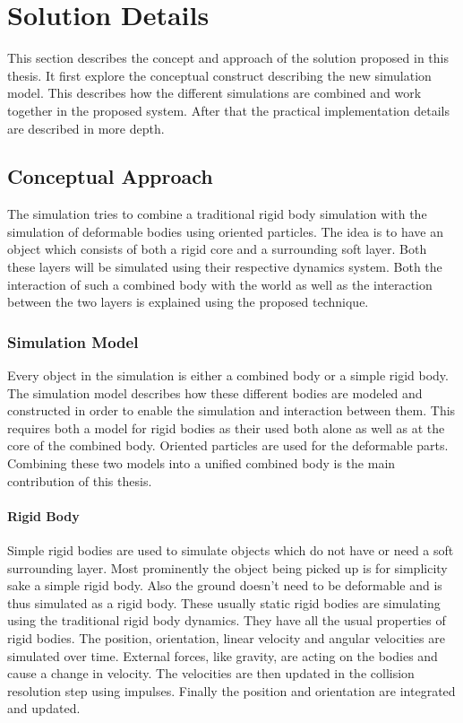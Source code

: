 \chapter{Solution Details}
\label{cha:solution_details}

This section describes the concept and approach of the solution proposed in this thesis. It first explore the conceptual construct describing the new simulation model. This describes how the different simulations are combined and work together in the proposed system. After that the practical implementation details are described in more depth.

\section{Conceptual Approach}
\label{sec:conceptual_approach}

The simulation tries to combine a traditional rigid body simulation with the simulation of deformable bodies using oriented particles. The idea is to have an object which consists of both a rigid core and a surrounding soft layer. Both these layers will be simulated using their respective dynamics system. Both the interaction of such a combined body with the world as well as the interaction between the two layers is explained using the proposed technique.

\subsection{Simulation Model}
\label{subsec:simulation_model}

Every object in the simulation is either a combined body or a simple rigid body. The simulation model describes how these different bodies are modeled and constructed in order to enable the simulation and interaction between them. This requires both a model for rigid bodies as their used both alone as well as at the core of the combined body. Oriented particles are used for the deformable parts. Combining these two models into a unified combined body is the main contribution of this thesis.
\subsubsection{Rigid Body}

Simple rigid bodies are used to simulate objects which do not have or need a soft surrounding layer. Most prominently the object being picked up is for simplicity sake a simple rigid body. Also the ground doesn't need to be deformable and is thus simulated as a rigid body. These usually static rigid bodies are simulating using the traditional rigid body dynamics. They have all the usual properties of rigid bodies. The position, orientation, linear velocity and angular velocities are simulated over time. External forces, like gravity, are acting on the bodies and cause a change in velocity. The velocities are then updated in the collision resolution step using impulses. Finally the position and orientation are integrated and updated.

